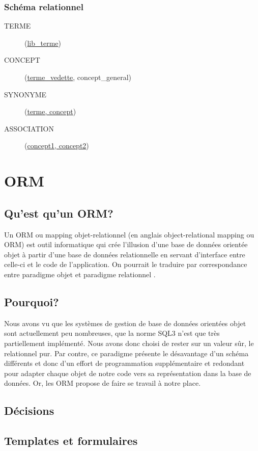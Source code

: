 \subsubsection{Schéma relationnel}
\begin{description}
\item[TERME](\underline{lib\_terme})
\item[CONCEPT](\underline{terme\_vedette}\up{\#}, concept\_general\up{\#})
\item[SYNONYME](\underline{terme\up{\#}, concept\up{\#}})
\item[ASSOCIATION](\underline{concept1\up{\#}, concept2\up{\#}})
\end{description}

\section{ORM}

	\subsection{Qu'est qu'un ORM?}
    Un ORM ou mapping objet-relationnel (en anglais object-relational mapping ou ORM) est outil informatique qui crée l'illusion d'une base de données orientée objet à partir d'une base de données relationnelle en servant d'interface entre celle-ci et le code de l'application. On pourrait le traduire par \og correspondance entre paradigme objet et paradigme relationnel \fg.
   
	\subsection{Pourquoi?}
    Nous avons vu que les systèmes de gestion de base de données orientées objet sont actuellement peu nombreuses,
    que la norme SQL3 n'est que très partiellement implémenté. Nous avons donc choisi de rester sur un valeur sûr,
    le relationnel pur. Par contre, ce paradigme présente le désavantage d'un schéma différents et donc d'un effort
    de programmation supplémentaire et redondant pour adapter chaque objet de notre code vers sa représentation
    dans la base de données. Or, les ORM propose de faire se travail à notre place.

	\subsection{Décisions}
	
	
\subsection{Templates et formulaires}

